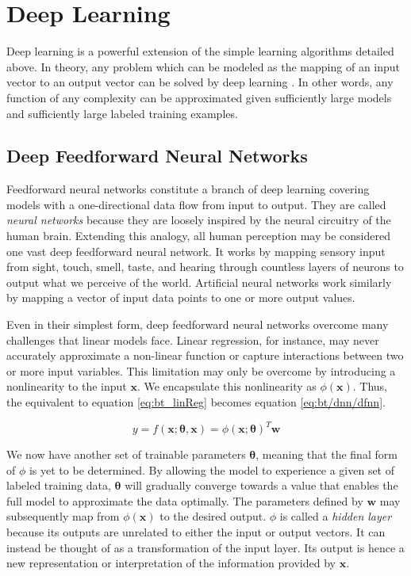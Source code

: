 \section{Deep Learning} \label{sec:bt/DNN}

Deep learning is a powerful extension of the simple learning algorithms detailed above. In theory, any problem which can be modeled as the mapping of an input vector to an output vector can be solved by deep learning \cite{goodfellow2016}. In other words, any function of any complexity can be approximated given sufficiently large models and sufficiently large labeled training examples. 

\subsection{Deep Feedforward Neural Networks}

Feedforward neural networks constitute a branch of deep learning covering models with a one-directional data flow from input to output. They are called \textit{neural networks} because they are loosely inspired by the neural circuitry of the human brain. Extending this analogy, all human perception may be considered one vast deep feedforward neural network. It works by mapping sensory input from sight, touch, smell, taste, and hearing through countless layers of neurons to output what we perceive of the world. Artificial neural networks work similarly by mapping a vector of input data points to one or more output values.

Even in their simplest form, deep feedforward neural networks overcome many challenges that linear models face. Linear regression, for instance, may never accurately approximate a non-linear function or capture interactions between two or more input variables. This limitation may only be overcome by introducing a nonlinearity to the input $\bm{x}$. We encapsulate this nonlinearity as $\phi(\bm{x})$. Thus, the equivalent to equation \ref{eq:bt_linReg} becomes equation \ref{eq:bt/dnn/dfnn}.

\begin{equation}
    \label{eq:bt/dnn/dfnn}
    y=f(\bm{x};\bm{\theta},\bm{x})=\phi(\bm{x};\bm{\theta})^T\bm{w}
\end{equation}

We now have another set of trainable parameters $\bm{\theta}$, meaning that the final form of $\phi$ is yet to be determined. By allowing the model to experience a given set of labeled training data, $\bm{\theta}$ will gradually converge towards a value that enables the full model to approximate the data optimally.
The parameters defined by $\bm{w}$ may subsequently map from $\phi(\bm{x})$ to the desired output. $\phi$ is called a \textit{hidden layer} because its outputs are unrelated to either the input or output vectors. It can instead be thought of as a transformation of the input layer. 
Its output is hence a new representation or interpretation of the information provided by $\bm{x}$.

